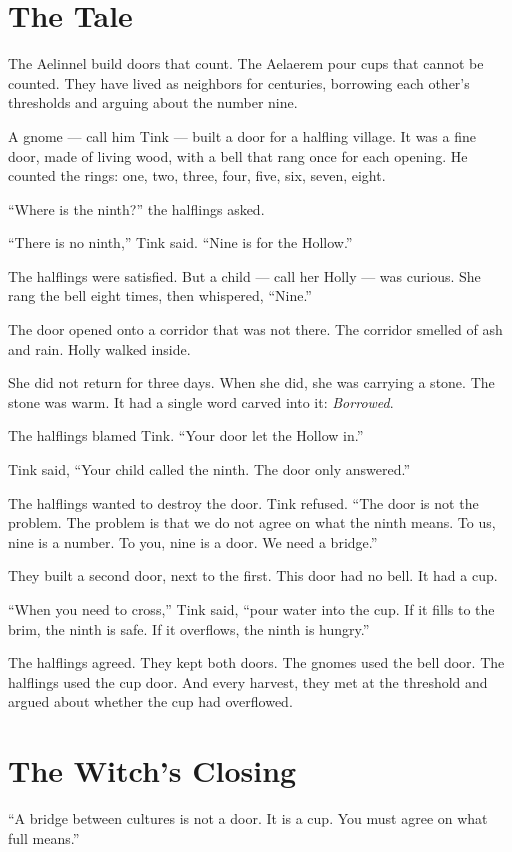 \documentclass[10pt,twoside]{book}
\begin{document}
\section*{The Tale}
The Aelinnel build doors that count. The Aelaerem pour cups that cannot be counted. They have lived as neighbors for centuries, borrowing each other's thresholds and arguing about the number nine.

A gnome --- call him Tink --- built a door for a halfling village. It was a fine door, made of living wood, with a bell that rang once for each opening. He counted the rings: one, two, three, four, five, six, seven, eight.

``Where is the ninth?'' the halflings asked.

``There is no ninth,'' Tink said. ``Nine is for the Hollow.''

The halflings were satisfied. But a child --- call her Holly --- was curious. She rang the bell eight times, then whispered, ``Nine.''

The door opened onto a corridor that was not there. The corridor smelled of ash and rain. Holly walked inside.

She did not return for three days. When she did, she was carrying a stone. The stone was warm. It had a single word carved into it: \textit{Borrowed}.

The halflings blamed Tink. ``Your door let the Hollow in.''

Tink said, ``Your child called the ninth. The door only answered.''

The halflings wanted to destroy the door. Tink refused. ``The door is not the problem. The problem is that we do not agree on what the ninth means. To us, nine is a number. To you, nine is a door. We need a bridge.''

They built a second door, next to the first. This door had no bell. It had a cup.

``When you need to cross,'' Tink said, ``pour water into the cup. If it fills to the brim, the ninth is safe. If it overflows, the ninth is hungry.''

The halflings agreed. They kept both doors. The gnomes used the bell door. The halflings used the cup door. And every harvest, they met at the threshold and argued about whether the cup had overflowed.

\section*{The Witch's Closing}
``A bridge between cultures is not a door. It is a cup. You must agree on what full means.''
\end{document}
